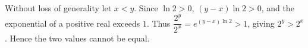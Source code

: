 Without loss of generality let $x<y$. Since $\ln2>0$, $(y-x)\ln2>0$, and the exponential of a positive real exceeds $1$. Thus $\dfrac{2^y}{2^x}=e^{(y-x)\ln2}>1$, giving $2^y>2^x$. Hence the two values cannot be equal.
